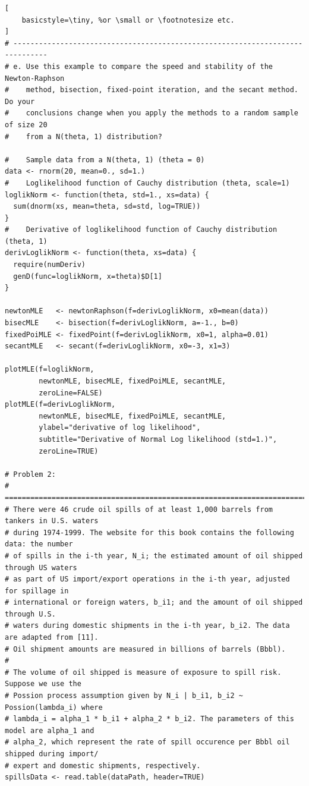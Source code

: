 \begin{appendices}
\begin{lstlisting}[
	basicstyle=\tiny, %or \small or \footnotesize etc.
]
# ------------------------------------------------------------------------------
# e. Use this example to compare the speed and stability of the Newton-Raphson 
#    method, bisection, fixed-point iteration, and the secant method. Do your 
#    conclusions change when you apply the methods to a random sample of size 20 
#    from a N(theta, 1) distribution?

#    Sample data from a N(theta, 1) (theta = 0)
data <- rnorm(20, mean=0., sd=1.)
#    Loglikelihood function of Cauchy distribution (theta, scale=1)
loglikNorm <- function(theta, std=1., xs=data) {
  sum(dnorm(xs, mean=theta, sd=std, log=TRUE))
}
#    Derivative of loglikelihood function of Cauchy distribution (theta, 1)
derivLoglikNorm <- function(theta, xs=data) {
  require(numDeriv)
  genD(func=loglikNorm, x=theta)$D[1]
}

newtonMLE   <- newtonRaphson(f=derivLoglikNorm, x0=mean(data))
bisecMLE    <- bisection(f=derivLoglikNorm, a=-1., b=0)
fixedPoiMLE <- fixedPoint(f=derivLoglikNorm, x0=1, alpha=0.01)
secantMLE   <- secant(f=derivLoglikNorm, x0=-3, x1=3)

plotMLE(f=loglikNorm, 
        newtonMLE, bisecMLE, fixedPoiMLE, secantMLE, 
        zeroLine=FALSE)
plotMLE(f=derivLoglikNorm, 
        newtonMLE, bisecMLE, fixedPoiMLE, secantMLE,
        ylabel="derivative of log likelihood", 
        subtitle="Derivative of Normal Log likelihood (std=1.)",
        zeroLine=TRUE)

# Problem 2:
# ==============================================================================
# There were 46 crude oil spills of at least 1,000 barrels from tankers in U.S. waters 
# during 1974-1999. The website for this book contains the following data: the number
# of spills in the i-th year, N_i; the estimated amount of oil shipped through US waters
# as part of US import/export operations in the i-th year, adjusted for spillage in 
# international or foreign waters, b_i1; and the amount of oil shipped through U.S. 
# waters during domestic shipments in the i-th year, b_i2. The data are adapted from [11].
# Oil shipment amounts are measured in billions of barrels (Bbbl).
# 
# The volume of oil shipped is measure of exposure to spill risk. Suppose we use the 
# Possion process assumption given by N_i | b_i1, b_i2 ~ Possion(lambda_i) where 
# lambda_i = alpha_1 * b_i1 + alpha_2 * b_i2. The parameters of this model are alpha_1 and
# alpha_2, which represent the rate of spill occurence per Bbbl oil shipped during import/
# expert and domestic shipments, respectively. 
spillsData <- read.table(dataPath, header=TRUE)


\end{lstlisting}
\end{appendices}
